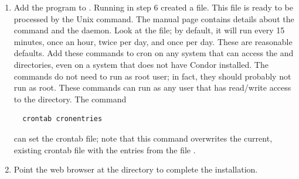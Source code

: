 \begin{enumerate}
\item Add the  program to .  
Running  in step 6 created a  file.
This  file is ready to be processed by the Unix
 command.
The  manual page contains details about
the  command and the  daemon.
Look at the
 file; by default, it will run 
  every 15 minutes, 
  once an hour, 
  twice per day, and 
  once per day.
These are reasonable defaults.  
Add these commands to cron on any
system that can access the  and
 directories,
even on a system that does not have Condor installed.
The commands do not need to run as root user;
in fact, they should probably not run as root.  These commands can run
as any user that has read/write access to the  directory.
The command
\begin{verbatim} 
  crontab cronentries
\end{verbatim}
can set the crontab file;
note that this command overwrites the current, existing crontab file with the 
entries from the file .

\item Point the web browser at the  directory
to complete the installation.

\end{enumerate}

